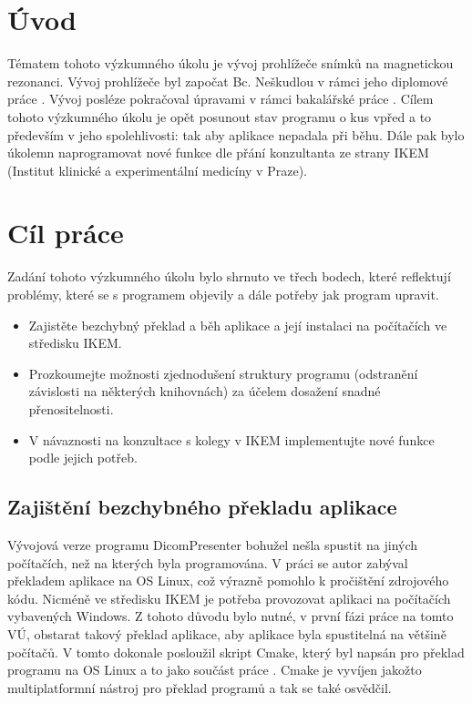 \chapter{Úvod}
\vspace{-10mm}
Tématem tohoto výzkumného úkolu je vývoj prohlížeče snímků na magnetickou rezonanci. Vývoj prohlížeče byl započat Bc. Neškudlou v rámci jeho diplomové práce \cite{neskudla}. Vývoj posléze pokračoval úpravami v rámci bakalářské práce \cite{flaska}. Cílem tohoto výzkumného úkolu je opět posunout stav programu o kus vpřed a to především v jeho spolehlivosti: tak aby aplikace nepadala při běhu. Dále pak bylo úkolemn naprogramovat nové funkce dle přání konzultanta ze strany IKEM (Institut klinické a experimentální medicíny v Praze).

\chapter{Cíl práce}
Zadání tohoto výzkumného úkolu bylo shrnuto ve třech bodech, které reflektují problémy, které se s programem objevily a dále potřeby jak program upravit.

\begin{itemize}
\item Zajistěte bezchybný překlad a běh aplikace a její instalaci na počítačích ve středisku IKEM.
\item Prozkoumejte možnosti zjednodušení struktury programu (odstranění závislosti na některých knihovnách) za účelem dosažení snadné přenositelnosti.
\item V návaznosti na konzultace s kolegy v IKEM implementujte nové funkce podle jejich potřeb.
\end{itemize}

\section{Zajištění bezchybného překladu aplikace}
Vývojová verze programu DicomPresenter bohužel nešla spustit na jiných počítačích, než na kterých byla programována. V práci \cite{flaska} se autor zabýval překladem aplikace na OS Linux, což výrazně pomohlo k pročištění zdrojového kódu. Nicméně ve středisku IKEM je potřeba provozovat aplikaci na počítačích vybavených Windows. Z tohoto důvodu bylo nutné, v první fázi práce na tomto VÚ, obstarat takový překlad aplikace, aby aplikace byla spustitelná na většině počítačů. V tomto dokonale posloužil skript Cmake, který byl napsán pro překlad programu na OS Linux a to jako součást práce \cite{flaska}. Cmake je vyvíjen jakožto multiplatformní nástroj pro překlad programů a tak se také osvědčil. 

